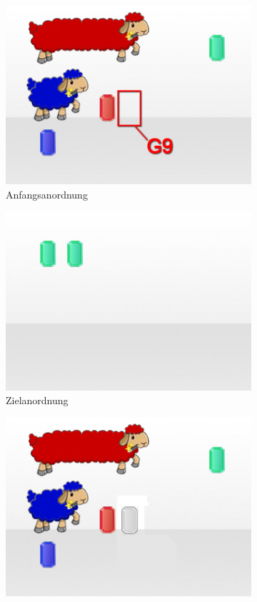 \begin{itemize}
\begin{figure}[H]
\begin{subfigure}{.3\textwidth}
\includegraphics[width=\textwidth]{../gui/level_example/game_wog.jpg}
\caption{Anfangsanordnung}
\end{subfigure}
\begin{subfigure}{.3\textwidth}
\includegraphics[width=\textwidth]{../gui/level_example/game_finish_wog.jpg}
\caption{Zielanordnung}
\end{subfigure}
\begin{subfigure}{.3\textwidth}
\includegraphics[width=\textwidth]{../gui/level_example/game_hint_wog.jpg}

\end{subfigure}
\end{figure}
\end{itemize}
